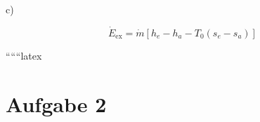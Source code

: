 c)

\[
\dot{E}_{\text{ex}} = \dot{m} \left[ h_e - h_a - T_0 (s_e - s_a) \right]
\]

``````latex


\section*{Aufgabe 2}